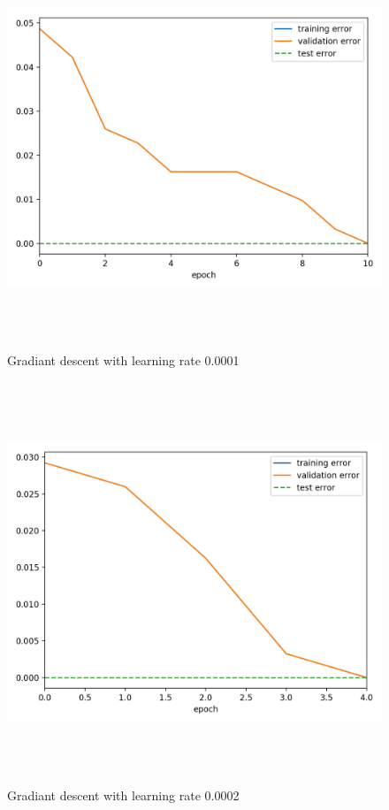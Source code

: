 \documentclass[a4paper]{article}
\begin{document}
\begin{figure}[h]
\caption{Gradiant descent with learning rate 0.0001}
\centering
\includegraphics[width=15cm, height=12cm]{GD_LR0001}
\end{figure}

\begin{figure}[h]
\caption{Gradiant descent with learning rate 0.0002}
\centering
\includegraphics[width=15cm, height=12cm]{GD_LR0002}
\end{figure}
\end{document}
